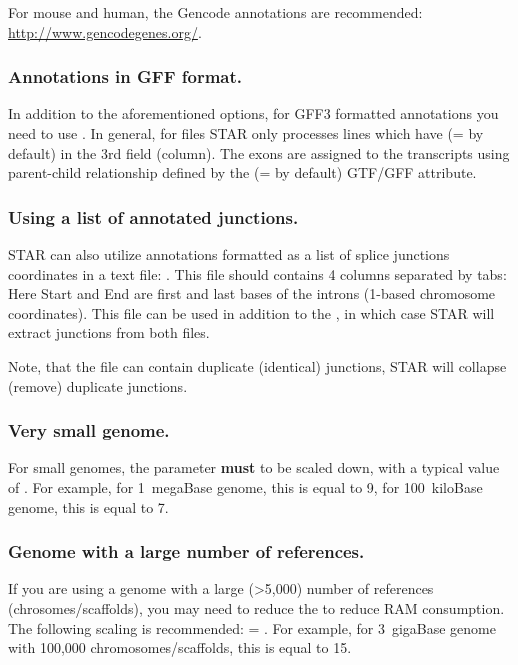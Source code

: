 \documentclass[12pt]{article}
\begin{document}
For mouse and human, the Gencode annotations are recommended: \url{http://www.gencodegenes.org/}.

\subsubsection{Annotations in GFF format.}
In addition to the aforementioned options, for GFF3 formatted annotations you need to use  . In general, for  files STAR only processes lines which have  (= by default) in the 3rd field (column). The exons are assigned to the transcripts using parent-child relationship defined by the  (= by default) GTF/GFF attribute.

\subsubsection{Using a list of annotated junctions.}
STAR can also utilize annotations formatted as a list of splice junctions coordinates in a text file:  . This file should contains 4 columns separated by tabs:
Here Start and End are first and last bases of the introns (1-based chromosome coordinates).
This file can be used in addition to the , in which case STAR will extract junctions from both files.

Note, that the  file can contain duplicate (identical) junctions, STAR will collapse (remove) duplicate junctions.

\subsubsection{Very small genome.}
For small genomes, the parameter  \textbf{must} to be scaled down, with a typical value of . For example, for 1~megaBase genome, this is equal to 9, for 100~kiloBase genome, this is equal to 7.

\subsubsection{Genome with a large number of references.}
If you are using a genome with a large (\textgreater 5,000) number of references (chrosomes/scaffolds), you may need to reduce the  to reduce RAM consumption. The following scaling is recommended:  = . For example, for 3~gigaBase genome with 100,000 chromosomes/scaffolds, this is equal to 15.
\end{document}
